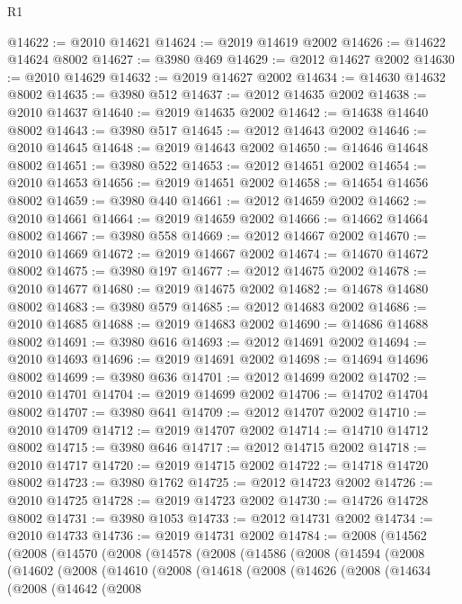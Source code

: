 \begin{lexlean}{R1}
\begin{coremodule}
@14622 := @2010 @14621
@14624 := @2019 @14619 @2002
@14626 := @14622 @14624 @8002
@14627 := @3980 @469
@14629 := @2012 @14627 @2002
@14630 := @2010 @14629
@14632 := @2019 @14627 @2002
@14634 := @14630 @14632 @8002
@14635 := @3980 @512
@14637 := @2012 @14635 @2002
@14638 := @2010 @14637
@14640 := @2019 @14635 @2002
@14642 := @14638 @14640 @8002
@14643 := @3980 @517
@14645 := @2012 @14643 @2002
@14646 := @2010 @14645
@14648 := @2019 @14643 @2002
@14650 := @14646 @14648 @8002
@14651 := @3980 @522
@14653 := @2012 @14651 @2002
@14654 := @2010 @14653
@14656 := @2019 @14651 @2002
@14658 := @14654 @14656 @8002
@14659 := @3980 @440
@14661 := @2012 @14659 @2002
@14662 := @2010 @14661
@14664 := @2019 @14659 @2002
@14666 := @14662 @14664 @8002
@14667 := @3980 @558
@14669 := @2012 @14667 @2002
@14670 := @2010 @14669
@14672 := @2019 @14667 @2002
@14674 := @14670 @14672 @8002
@14675 := @3980 @197
@14677 := @2012 @14675 @2002
@14678 := @2010 @14677
@14680 := @2019 @14675 @2002
@14682 := @14678 @14680 @8002
@14683 := @3980 @579
@14685 := @2012 @14683 @2002
@14686 := @2010 @14685
@14688 := @2019 @14683 @2002
@14690 := @14686 @14688 @8002
@14691 := @3980 @616
@14693 := @2012 @14691 @2002
@14694 := @2010 @14693
@14696 := @2019 @14691 @2002
@14698 := @14694 @14696 @8002
@14699 := @3980 @636
@14701 := @2012 @14699 @2002
@14702 := @2010 @14701
@14704 := @2019 @14699 @2002
@14706 := @14702 @14704 @8002
@14707 := @3980 @641
@14709 := @2012 @14707 @2002
@14710 := @2010 @14709
@14712 := @2019 @14707 @2002
@14714 := @14710 @14712 @8002
@14715 := @3980 @646
@14717 := @2012 @14715 @2002
@14718 := @2010 @14717
@14720 := @2019 @14715 @2002
@14722 := @14718 @14720 @8002
@14723 := @3980 @1762
@14725 := @2012 @14723 @2002
@14726 := @2010 @14725
@14728 := @2019 @14723 @2002
@14730 := @14726 @14728 @8002
@14731 := @3980 @1053
@14733 := @2012 @14731 @2002
@14734 := @2010 @14733
@14736 := @2019 @14731 @2002
@14784 := @2008
    (@14562
      (@2008
        (@14570
          (@2008
            (@14578
              (@2008
                (@14586
                  (@2008
                    (@14594
                      (@2008
                        (@14602
                          (@2008
                            (@14610
                              (@2008
                                (@14618
                                  (@2008
                                    (@14626
                                      (@2008
                                        (@14634
                                          (@2008
                                            (@14642
                                              (@2008

\end{coremodule}
\end{lexlean}
